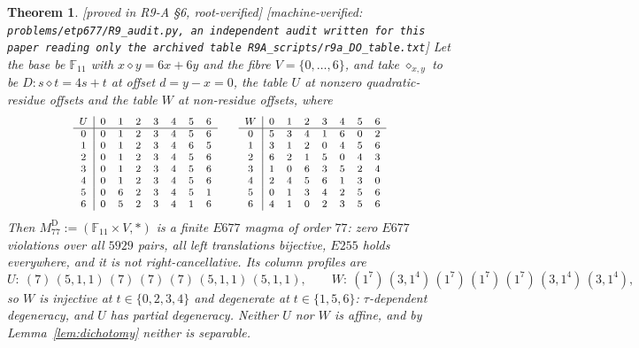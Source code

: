 \documentclass[11pt]{article}
\theoremstyle{plain}
\newtheorem{theorem}{Theorem}[section]
\theoremstyle{definition}
\theoremstyle{remark}
\numberwithin{equation}{section}
\newcommand{\F}{\mathbb{F}}
\newcommand{\op}{\mathbin{*}}
\newcommand{\statusbox}[1]{{\small\sloppy\textsf{[#1]}}}
\newcommand{\MV}[1]{\statusbox{machine-verified: \texttt{#1}}}
\newcommand{\PROVED}[1]{\statusbox{proved in #1, root-verified}}
\begin{document}
\begin{theorem}\label{thm:m77D}
\PROVED{R9-A \S6}\;%
\MV{problems\slash etp677\slash R9\_audit.py, an independent audit written for
this paper reading only the archived table
R9A\_scripts\slash r9a\_DO\_table.txt}
Let the base be $\F_{11}$ with $x\diamond y = 6x+6y$ and the fibre
$V = \{0,\dots,6\}$, and take $\diamond_{x,y}$ to be $D : s\diamond t = 4s+t$ at
offset $d = y-x = 0$, the table $U$ at nonzero quadratic-residue offsets and the
table $W$ at non-residue offsets, where
\[
{\footnotesize
\begin{array}{c|ccccccc}
U & 0&1&2&3&4&5&6\\\hline
0 & 0&1&2&3&4&5&6\\
1 & 0&1&2&3&4&6&5\\
2 & 0&1&2&3&4&5&6\\
3 & 0&1&2&3&4&5&6\\
4 & 0&1&2&3&4&5&6\\
5 & 0&6&2&3&4&5&1\\
6 & 0&5&2&3&4&1&6
\end{array}
\qquad
\begin{array}{c|ccccccc}
W & 0&1&2&3&4&5&6\\\hline
0 & 5&3&4&1&6&0&2\\
1 & 3&1&2&0&4&5&6\\
2 & 6&2&1&5&0&4&3\\
3 & 1&0&6&3&5&2&4\\
4 & 2&4&5&6&1&3&0\\
5 & 0&1&3&4&2&5&6\\
6 & 4&1&0&2&3&5&6
\end{array}}
\]
Then $M_{77}^{\mathrm{D}} := (\F_{11}\times V,\op)$ is a finite $E677$ magma of
order $77$: zero $E677$ violations over all $5929$ pairs, all left translations
bijective, $E255$ holds everywhere, and it is not right-cancellative. Its column
profiles are
\[
  U:\ (7)\,(5,1,1)\,(7)\,(7)\,(7)\,(5,1,1)\,(5,1,1),
  \qquad
  W:\ (1^7)\,(3,1^4)\,(1^7)\,(1^7)\,(1^7)\,(3,1^4)\,(3,1^4),
\]
so $W$ is injective at $t\in\{0,2,3,4\}$ and degenerate at $t\in\{1,5,6\}$:
\emph{$\tau$-dependent degeneracy}, and $U$ has partial degeneracy. Neither $U$
nor $W$ is affine, and by Lemma~\ref{lem:dichotomy} neither is separable.
\end{theorem}
\end{document}
